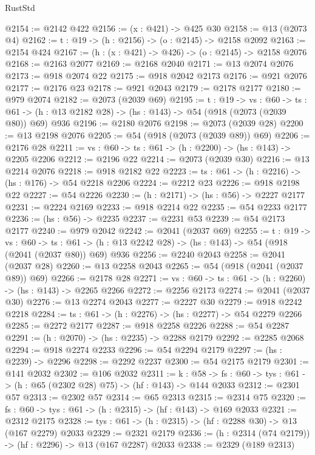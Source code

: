\begin{lexlean}{RustStd}
\begin{coremodule}
@2154 := @2142 @422
@2156 := (x : @421) -> @425 @30
@2158 := @13 (@2073 @4)
@2162 := {t : @19} -> (h : @2156) -> (o : @2145) -> @2158 @2092
@2163 := @2154 @424
@2167 := (h : (x : @421) -> @426) -> (o : @2145) -> @2158 @2076
@2168 := @2163 @2077
@2169 := @2168 @2040
@2171 := @13 @2074 @2076
@2173 := @918 @2074 @22
@2175 := @918 @2042 @2173
@2176 := @921 @2076
@2177 := @2176 @23
@2178 := @921 @2043
@2179 := @2178 @2177
@2180 := @979 @2074
@2182 := @2073 (@2039 @69)
@2195 := {t : @19} ->
  {vs : @60} ->
  {ts : @61} -> (h : @13 @2182 @28) -> (hs : @143) -> @54 (@918 (@2073 (@2039 @80)) @69) @936
@2196 := @2180 @2076
@2198 := @2073 (@2039 @28)
@2200 := @13 @2198 @2076
@2205 := @54 (@918 (@2073 (@2039 @89)) @69)
@2206 := @2176 @28
@2211 := {vs : @60} -> {ts : @61} -> (h : @2200) -> (hs : @143) -> @2205 @2206
@2212 := @2196 @22
@2214 := @2073 (@2039 @30)
@2216 := @13 @2214 @2076
@2218 := @918 @2182 @22
@2223 := {ts : @61} -> (h : @2216) -> (hs : @176) -> @54 @2218 @2206
@2224 := @2212 @23
@2226 := @918 @2198 @22
@2227 := @54 @2226
@2230 := (h : @2171) -> (hs : @56) -> @2227 @2177
@2231 := @2224 @2169
@2233 := @918 @2214 @22
@2235 := @54 @2233 @2177
@2236 := (hs : @56) -> @2235
@2237 := @2231 @53
@2239 := @54 @2173 @2177
@2240 := @979 @2042
@2242 := @2041 (@2037 @69)
@2255 := {t : @19} ->
  {vs : @60} ->
  {ts : @61} -> (h : @13 @2242 @28) -> (hs : @143) -> @54 (@918 (@2041 (@2037 @80)) @69) @936
@2256 := @2240 @2043
@2258 := @2041 (@2037 @28)
@2260 := @13 @2258 @2043
@2265 := @54 (@918 (@2041 (@2037 @89)) @69)
@2266 := @2178 @28
@2271 := {vs : @60} -> {ts : @61} -> (h : @2260) -> (hs : @143) -> @2265 @2266
@2272 := @2256 @2173
@2274 := @2041 (@2037 @30)
@2276 := @13 @2274 @2043
@2277 := @2227 @30
@2279 := @918 @2242 @2218
@2284 := {ts : @61} -> (h : @2276) -> (hs : @2277) -> @54 @2279 @2266
@2285 := @2272 @2177
@2287 := @918 @2258 @2226
@2288 := @54 @2287
@2291 := (h : @2070) -> (hs : @2235) -> @2288 @2179
@2292 := @2285 @2068
@2294 := @918 @2274 @2233
@2296 := @54 @2294 @2179
@2297 := (hs : @2239) -> @2296
@2298 := @2292 @2237
@2300 := @54 @2175 @2179
@2301 := @141 @2032
@2302 := @106 @2032
@2311 := {k : @58} ->
  {fs : @60} -> {tys : @61} -> (h : @65 (@2302 @28) @75) -> (hf : @143) -> @144 @2033
@2312 := @2301 @57
@2313 := @2302 @57
@2314 := @65 @2313
@2315 := @2314 @75
@2320 := {fs : @60} -> {tys : @61} -> (h : @2315) -> (hf : @143) -> @169 @2033
@2321 := @2312 @2175
@2328 := {tys : @61} -> (h : @2315) -> (hf : @2288 @30) -> @13 (@167 @2279) @2033
@2329 := @2321 @2179
@2336 := (h : @2314 (@74 @2179)) -> (hf : @2296) -> @13 (@167 @2287) @2033
@2338 := @2329 (@189 @2313)

\end{coremodule}
\end{lexlean}
